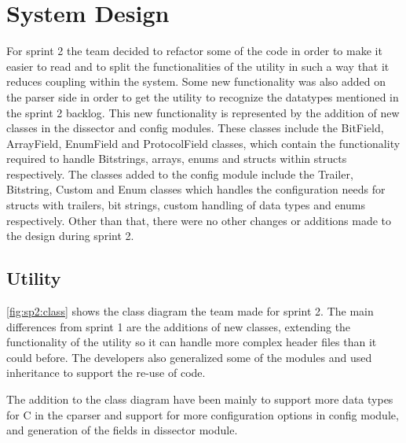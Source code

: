 \section{System Design}
\label{sec:sp2:design}
For sprint 2 the team decided to refactor some of the code in order to make it easier to read and to split the functionalities of the \gls{utility} in such a way that it reduces coupling within the system. Some new functionality was also added on the \gls{parser} side in order to get the \gls{utility} to recognize the datatypes mentioned in the sprint 2 backlog. This new functionality is represented by the addition of new classes in the \gls{dissector} and config modules. These classes include the BitField, ArrayField, EnumField and ProtocolField classes, which contain the functionality required to handle Bitstrings, \glspl{array}, \glspl{enum} and \glspl{struct} within \glspl{struct} respectively. The classes added to the config module include the Trailer, Bitstring, Custom and Enum classes which handles the configuration needs for \glspl{struct} with \gls{trailers}, \glspl{bit string}, custom handling of data types and \glspl{enum} respectively. Other than that, there were no other changes or additions made to the design during sprint 2.

\subsection{Utility}
\autoref{fig:sp2:class} shows the class diagram the team made for sprint 2. 
The main differences from sprint 1 are the additions of new classes, extending 
the functionality of the \gls{utility} so it can handle 
more complex \gls{header} files than it could before. The developers also 
generalized some of the modules and used inheritance to support the re-use of 
code.

The addition to the class diagram have been mainly to support more data types 
for C in the cparser and support for more configuration options in config 
module, and generation of the fields in dissector module.
 
